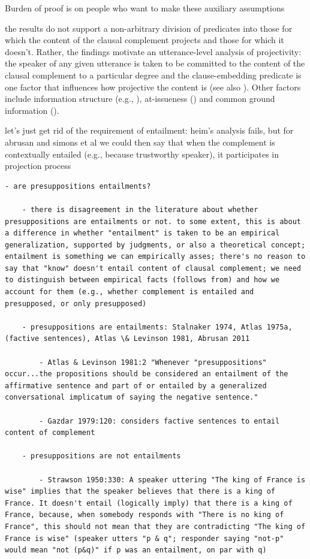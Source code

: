 \documentclass[11pt,fleqn]{article}
\newcommand{\6}{\mbox{$[\hspace*{-.6mm}[$}}
\newcommand{\9}{\mbox{$]\hspace*{-.6mm}]$}}
\begin{document}
{Burden of proof is on people who want to make these auxiliary assumptions

the results do not support a non-arbitrary division of predicates into those for which the content of the clausal complement projects and those for which it doesn't.  Rather, the findings motivate an utterance-level analysis of projectivity: the speaker of any given utterance is taken to be committed to the content of the clausal complement to a particular degree and the clause-embedding predicate is one factor that influences how projective the content is (see also \citealt{tbd-variability}). Other factors include information structure (e.g., \citealt{cummins-rohde2015,tonhauser-salt26,djaerv-bacovcin-salt27}), at-issueness (\citealt{tbd-variability}) and common ground information (\citealt{gazdar79a,tonhauser-etal-eval}).


let's just get rid of the requirement of entailment: heim's analysis fails, but for abrusan and simons et al we could then say that when the complement is contextually entailed (e.g., because trustworthy speaker), it participates in projection process

\begin{verbatim}
- are presuppositions entailments?

	- there is disagreement in the literature about whether presuppositions are entailments or not. to some extent, this is about a difference in whether "entailment" is taken to be an empirical generalization, supported by judgments, or also a theoretical concept; entailment is something we can empirically asses; there's no reason to say that "know" doesn't entail content of clausal complement; we need to distinguish between empirical facts (follows from) and how we account for them (e.g., whether complement is entailed and presupposed, or only presupposed)
	
	- presuppositions are entailments: Stalnaker 1974, Atlas 1975a, (factive sentences), Atlas \& Levinson 1981, Abrusan 2011
	
		- Atlas & Levinson 1981:2 "Whenever "presuppositions" occur...the propositions should be considered an entailment of the affirmative sentence and part of or entailed by a generalized conversational implicatum of saying the negative sentence."
		
		- Gazdar 1979:120: considers factive sentences to entail content of complement
		
	- presuppositions are not entailments	
	
		- Strawson 1950:330: A speaker uttering "The king of France is wise" implies that the speaker believes that there is a king of France. It doesn't entail (logically imply) that there is a king of France, because, when somebody responds with "There is no king of France", this should not mean that they are contradicting "The king of France is wise" (speaker utters "p & q"; responder saying "not-p" would mean "not (p&q)" if p was an entailment, on par with q)
		

\end{verbatim}}
\end{document}
